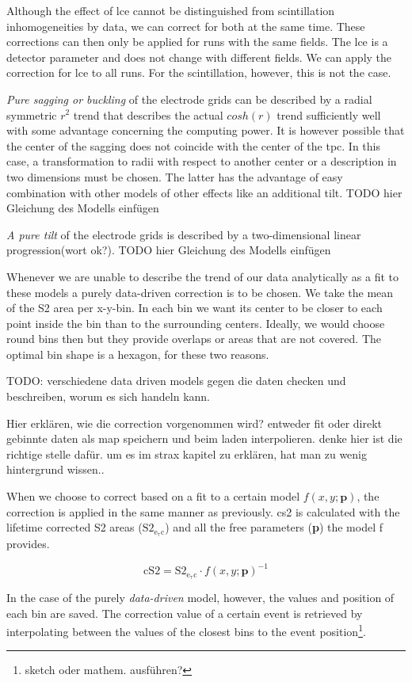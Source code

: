 Although the effect of \gls{lce} cannot be distinguished from scintillation inhomogeneities by data, we can correct for both at the same time.
These corrections can then only be applied for runs with the same fields.
The \gls{lce} is a detector parameter and does not change with different fields.
We can apply the correction for \gls{lce} to all runs.
For the scintillation, however, this is not the case.




\emph{Pure sagging or buckling} of the electrode grids can be described by a radial symmetric $ r^2 $ trend that describes the actual $ cosh\left( r \right) $ trend sufficiently well with some advantage concerning the computing power.
It is however possible that the center of the sagging does not coincide with the center of the \gls{tpc}.
In this case, a transformation to radii with respect to another center or a description in two dimensions must be chosen.
The latter has the advantage of easy combination with other models of other effects like an additional tilt.
TODO hier Gleichung des Modells einfügen

\emph{A pure tilt} of the electrode grids is described by a two-dimensional linear progression(wort ok?).
TODO hier Gleichung des Modells einfügen

Whenever we are unable to describe the trend of our data analytically as a fit to these models a purely data-driven correction is to be chosen.
We take the mean of the S2 area per x-y-bin.
In each bin we want its center to be closer to each point inside the bin than to the surrounding centers.
Ideally, we would choose round bins then but they provide overlaps or areas that are not covered.
The optimal bin shape is a hexagon, for these two reasons.

TODO: verschiedene data driven models gegen die daten checken und beschreiben, worum es sich handeln kann.


Hier erklären, wie die correction vorgenommen wird? entweder fit oder direkt gebinnte daten als map speichern und beim laden interpolieren. denke hier ist die richtige stelle dafür. um es im strax kapitel zu erklären, hat man zu wenig hintergrund wissen..

When we choose to correct based on a fit to a certain model $ f\left( x,y;\mathbf{p} \right) $, the correction is applied in the same manner as previously. \gls{cs2} is calculated with the lifetime corrected S2 areas ($ \mathrm{S2_\mathrm{e_\tau c}} $) and all the free parameters (\textbf{p}) the model f provides.

\begin{equation} %
    \mathrm{cS2} = \mathrm{S2_\mathrm{e_\tau c}} \cdot f\left( x,y; \mathbf{p} \right)^{-1}
    \label{eq:cs2}
\end{equation}

In the case of the purely \emph{data-driven} model, however, the values and position of each bin are saved.
The correction value of a certain event is retrieved by interpolating between the values of the closest bins to the event position\footnote{sketch oder mathem. ausführen?}.


